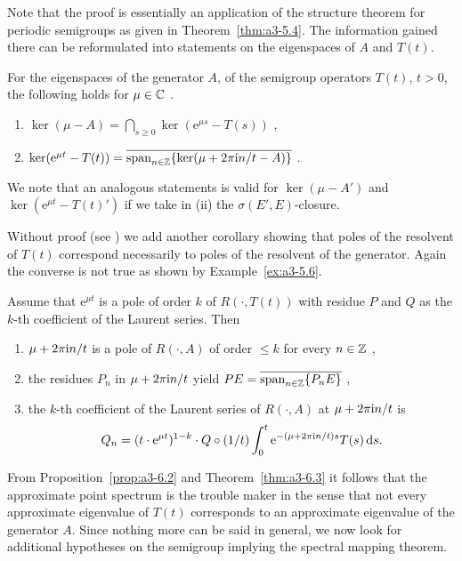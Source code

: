 Note that the proof is essentially an application of the structure theorem for periodic semigroups as given in Theorem~\ref{thm:a3-5.4}.
The information gained there can be reformulated into statements on the eigenspaces of $A$ and $T(t)$.
\begin{corollary}\label{cor:a3-6.4}
For the eigenspaces of the generator $A$, \resp of the semigroup operators $T(t)$, $t > 0$, the following holds  for  $\mu \in \mathbb{C}$ .
\begin{enumerate}[\upshape (i)]
\item 
$\ker(\mu - A) = \bigcap_{s \geq 0} \ker(\mathrm{e}^{\mu s} - T(s))$ ,

\item 
$\ker(\mathrm{e}^{\mu t} - T(t)) = \overline{\mathrm{span}_{n \in \mathbb{Z}} \{\ker(\mu + 2\pi\mathrm{i}  n/t - A)\}}$ .

\end{enumerate}
\end{corollary}
We note that an analogous statements is valid for $\ker(\mu - A')$ and $\ker(\mathrm{e}^{\mu t} - T(t)')$ if we take in (ii) the $\sigma(E',E)$-closure.

Without proof (see \citet[Proposition~1.10]{greiner:1981}) we add another corollary showing that poles of the resolvent of $T(t)$ correspond necessarily to poles of the resolvent of the generator.
Again the converse is not true as shown by Example~\ref{ex:a3-5.6}.
\begin{corollary}\label{cor:a3-6.5}
Assume that $\mathrm{e}^{\mu t}$ is a pole of order $k$ of $R(\cdot,T(t))$ with residue $P$ and $Q$ as the $k$-th coefficient of the Laurent series.
Then
\begin{enumerate}[\upshape (i)]
\item 
$\mu + 2\pi\mathrm{i}  n/t$ is a pole of $R(\cdot,A)$ of order $\leq k$ for every $n \in \mathbb{Z}$ ,

\item 
the residues $P_{n}$ in $\mu + 2\pi\mathrm{i}  n/t$ yield $PE = \overline{\text{span}_{n \in \mathbb{Z}} \{P_{n}E\}}$ ,

\item 
the $k$-th coefficient of the Laurent series of $R(\cdot,A)$ at $\mu + 2\pi\mathrm{i}  n/t$ is
\[
Q_{n} = (t \cdot \mathrm{e}^{\mu t})^{1-k} \cdot Q \circ (1/t) \int_{0}^{t} \mathrm{e}^{-(\mu+2\pi\mathrm{i}  n/t)s}T(s) \mathop{}\!\mathrm{d}{s} .
\]
\end{enumerate}
\end{corollary}
From Proposition~\ref{prop:a3-6.2} and Theorem~\ref{thm:a3-6.3} it follows that the approximate point spectrum is the trouble maker in the sense that not every approximate eigenvalue of $T(t)$ corresponds to an approximate eigenvalue of the generator $A$.
Since nothing more can be said in general, we now look for additional hypotheses on the semigroup implying the spectral mapping theorem.

